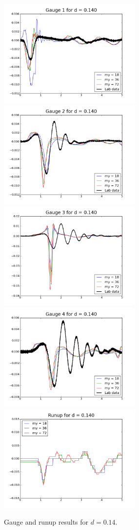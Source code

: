 \begin{figure}[ht]

\hfil\includegraphics[width=2.8in]{bp3/gauge1-d0-14.png}\hfil
\hfil\includegraphics[width=2.8in]{bp3/gauge2-d0-14.png}\hfil
\vskip 10pt
\hfil\includegraphics[width=2.8in]{bp3/gauge3-d0-14.png}\hfil
\hfil\includegraphics[width=2.8in]{bp3/gauge4-d0-14.png}\hfil
\vskip 10pt
\hfil\includegraphics[width=2.8in]{bp3/runup-d0-14.png}\hfil

\caption{\label{fig:bp3gauge5} 
Gauge and runup results for $d=0.14$.
  }
\end{figure}



